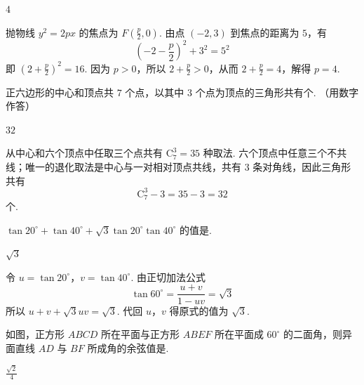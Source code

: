 \begin{answer}
\(4\)
\end{answer}

\begin{solution}
抛物线 \(y^2=2px\) 的焦点为 \(F\left(\frac{p}{2},0\right)\). 由点 \((-2,3)\) 到焦点的距离为 \(5\)，有
\[
\left(-2-\frac{p}{2}\right)^2+3^2=5^2
\]
即 \(\left(2+\frac{p}{2}\right)^2=16\). 因为 \(p>0\)，所以 \(2+\frac{p}{2}>0\)，从而 \(2+\frac{p}{2}=4\)，解得 \(p=4\).
\end{solution}

\begin{problem}
正六边形的中心和顶点共 \(7\text{ 个}\)点，以其中 \(3\text{ 个}\)点为顶点的三角形共有\fillinblank{}个. （用数字作答）
\end{problem}

\begin{answer}
\(32\)
\end{answer}

\begin{solution}
从中心和六个顶点中任取三个点共有 \(\mathrm C_7^3=35\) 种取法. 六个顶点中任意三个不共线；唯一的退化取法是中心与一对相对顶点共线，共有 \(3\) 条对角线，因此三角形共有
\[
\mathrm C_7^3-3=35-3=32
\]
个.
\end{solution}

\begin{problem}
\(\tan 20^{\circ} + \tan 40^{\circ} + \sqrt{3}\tan 20^{\circ}\tan 40^{\circ}\) 的值是\fillinblank{}.
\end{problem}

\begin{answer}
\(\sqrt{3}\)
\end{answer}

\begin{solution}
令 \(u=\tan20^{\circ}\)，\(v=\tan40^{\circ}\). 由正切加法公式
\[
\tan60^{\circ}=\frac{u+v}{1-uv}=\sqrt{3}
\]
所以 \(u+v+\sqrt{3}uv=\sqrt{3}\). 代回 \(u\)，\(v\) 得原式的值为 \(\sqrt{3}\).
\end{solution}

\begin{problem}
如图，正方形 \(ABCD\) 所在平面与正方形 \(ABEF\) 所在平面成 \(60^{\circ}\) 的二面角，则异面直线 \(AD\) 与 \(BF\) 所成角的余弦值是\fillinblank{}.

\end{problem}

\begin{answer}
\(\frac{\sqrt{2}}{4}\)
\end{answer}

